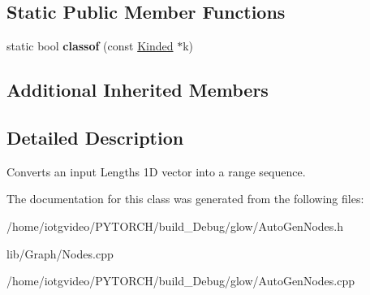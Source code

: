 \subsection*{Static Public Member Functions}
\begin{DoxyCompactItemize}
\item 
\mbox{\label{classglow_1_1_lengths_range_fill_node_ab57f828f7850e18d3a0091fd1ddb8716}} 
static bool {\bfseries classof} (const \hyperlink{classglow_1_1_kinded}{Kinded} $\ast$k)
\end{DoxyCompactItemize}
\subsection*{Additional Inherited Members}


\subsection{Detailed Description}
Converts an input Lengths 1D vector into a range sequence. 

The documentation for this class was generated from the following files\+:\begin{DoxyCompactItemize}
\item 
/home/iotgvideo/\+P\+Y\+T\+O\+R\+C\+H/build\+\_\+\+Debug/glow/Auto\+Gen\+Nodes.\+h\item 
lib/\+Graph/Nodes.\+cpp\item 
/home/iotgvideo/\+P\+Y\+T\+O\+R\+C\+H/build\+\_\+\+Debug/glow/Auto\+Gen\+Nodes.\+cpp\end{DoxyCompactItemize}
